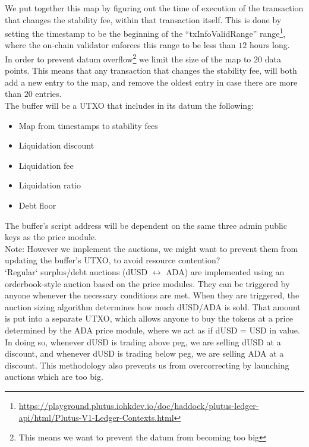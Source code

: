 \documentclass{article} %
\begin{document}
We put together this map by figuring out the time of execution of the
transaction that changes the stability fee, within that transaction itself.
This is done by setting the timestamp to be the beginning of the
``txInfoValidRange'' range\footnote{
  \url{https://playground.plutus.iohkdev.io/doc/haddock/plutus-ledger-api/html/Plutus-V1-Ledger-Contexts.html}},
where the on-chain validator enforces this range to be less than $12$ hours
long. \\

In order to prevent datum overflow\footnote{
  This means we want to prevent the datum from becoming too big}
we limit the size of the map to $20$ data points.
This means that any transaction that changes the stability fee, will both add a
new entry to the map, and remove the oldest entry in case there are more than
$20$ entries. \\

The buffer will be a UTXO that includes in its datum the following:
\begin{itemize}
  \item Map from timestamps to stability fees
  \item Liquidation discount
  \item Liquidation fee
  \item Liquidation ratio
  \item Debt floor
\end{itemize}
The buffer's script address will be dependent on the same three admin public
keys as the price module. \\

Note: However we implement the auctions, we might want to prevent them from
updating the buffer's UTXO, to avoid resource contention? \\

`Regular` surplus/debt auctions (dUSD $\leftrightarrow$ ADA) are implemented
using an orderbook-style auction based on the price modules.
They can be triggered by anyone whenever the necessary conditions are met.
When they are triggered, the auction sizing algorithm determines how much
dUSD/ADA is sold.
That amount is put into a separate UTXO, which allows anyone to buy the tokens
at a price determined by the ADA price module, where we act as if dUSD = USD in
value.
In doing so, whenever dUSD is trading above peg, we are selling dUSD at a
discount, and whenever dUSD is trading below peg, we are selling ADA at a
discount.
This methodology also prevents us from overcorrecting by launching auctions
which are too big. \\
\end{document}
